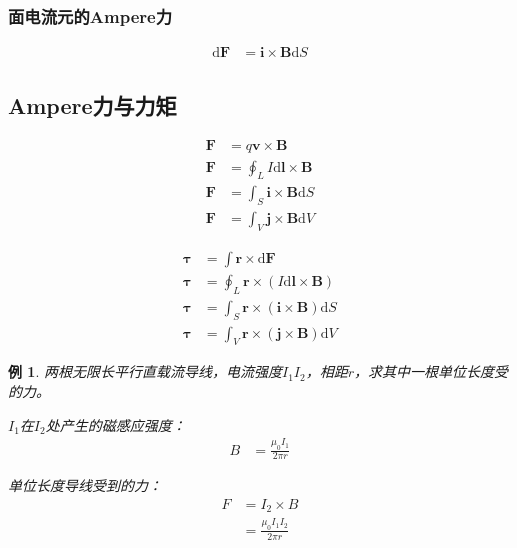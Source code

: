 \documentclass[12pt,onecolumn,a4paper]{book}
\newtheorem*{example}{例}
\numberwithin{table}{subsection}
\numberwithin{equation}{subsection}
\begin{document}
\subsubsection{面电流元的Ampere力}

\begin{align}
    \mathrm{d} \mathbf{F} & =  \mathbf{i} \times \mathbf{B}\mathrm{d} S
\end{align}

\subsection{Ampere力与力矩}

\begin{align}
    \mathbf{F} & = q\mathbf{v} \times \mathbf{B}                       \\
    \mathbf{F} & = \oint_{L} I \mathrm{d} \mathbf{l} \times \mathbf{B} \\
    \mathbf{F} & = \int_{S} \mathbf{i} \times \mathbf{B} \mathrm{d} S  \\
    \mathbf{F} & = \int_{V} \mathbf{j} \times \mathbf{B} \mathrm{d} V
\end{align}

\begin{align}
    \mathbf{\tau} & = \int \mathbf{r} \times \mathrm{d} \mathbf{F}                            \\
    \mathbf{\tau} & = \oint_{L} \mathbf{r} \times (I \mathrm{d} \mathbf{l} \times \mathbf{B}) \\
    \mathbf{\tau} & = \int_{S} \mathbf{r} \times (\mathbf{i} \times \mathbf{B}) \mathrm{d} S  \\
    \mathbf{\tau} & = \int_{V} \mathbf{r} \times (\mathbf{j} \times \mathbf{B}) \mathrm{d} V
\end{align}

\begin{example}
    两根无限长平行直载流导线，电流强度$I_1I_2$，相距$r$，求其中一根单位长度受的力。

    $I_1$在$I_2$处产生的磁感应强度：
    \begin{align}
        B & = \frac{\mu_0 I_1}{2\pi r}
    \end{align}

    单位长度导线受到的力：
    \begin{align}
        F & = I_2  \times B                \\
          & = \frac{\mu_0 I_1 I_2}{2\pi r}
    \end{align}

\end{example}
\end{document}
